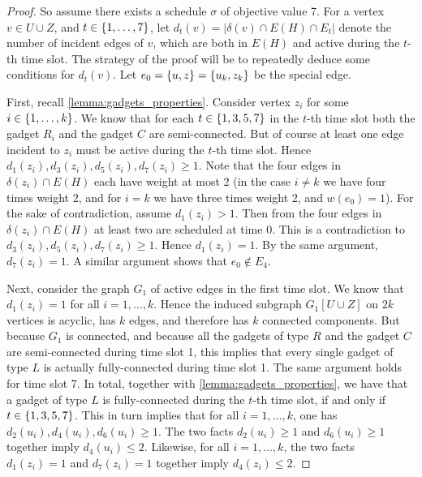 \begin{proof}
So assume there exists a schedule $\sigma$ of objective value 7. 
For a vertex $v \in U \cup Z$, and $t \in \{ 1, \ldots, 7 \}$, let $d_t(v) = |\delta(v) \cap E(H) \cap E_t|$ denote the number of incident edges of $v$, which are both in $E(H)$ and active during the $t$-th time slot. The strategy of the proof will be to repeatedly deduce some conditions for $d_t(v)$. 
Let $e_0 = \{ u, z \} = \{ u_k, z_k \}$ be the special edge.

First, recall \cref{lemma:gadgets_properties}. Consider vertex $z_i$ for some $i \in \{ 1, \ldots, k \}$. We know that for each $t \in \{ 1, 3, 5, 7 \}$ in the $t$-th time slot both the gadget $R_i$ and the gadget $C$ are semi-connected. But of course at least one edge incident to $z_i$ must be active during the $t$-th time slot. Hence $d_1(z_i), d_3(z_i), d_5(z_i), d_7(z_i) \geq 1$.  Note that the four edges in $\delta(z_i) \cap E(H)$ each have weight at most 2 (in the case $i \neq k$ we have four times weight 2, and for $i = k$ we have three times weight 2, and $w(e_0) = 1$). For the sake of contradiction, assume $d_1(z_i) > 1$. Then from the four edges in $\delta(z_i) \cap E(H)$ at least two are scheduled at time $0$. This is a contradiction to  $d_3(z_i), d_5(z_i), d_7(z_i) \geq 1$. Hence $d_1(z_i) = 1$. By the same argument, $d_7(z_i) = 1$. A similar argument shows that $e_0 \not\in E_4$.

Next, consider the graph $G_1$ of active edges in the first time slot. We know that  $d_1(z_i) = 1$ for all $i= 1,\dots, k$. Hence the induced subgraph $G_1[U \cup Z]$ on $2k$ vertices is acyclic, has $k$ edges, and therefore has $k$ connected components. But because $G_1$ is connected, and because all the gadgets of type $R$ and the gadget $C$ are semi-connected during time slot 1, this implies that every single gadget of type $L$ is actually fully-connected during time slot 1. The same argument holds for time slot 7. In total, together with \cref{lemma:gadgets_properties}, we have that a gadget of type $L$ is fully-connected during the $t$-th time slot, if and only if $t \in \{ 1, 3, 5, 7 \}$. This in turn implies that for all $i = 1,\dots, k$, one has $d_2(u_i), d_4(u_i), d_6(u_i) \geq 1$. The two facts $d_2(u_i) \geq 1$ and $d_6(u_i) \geq 1$ together imply $d_4(u_i) \leq 2$. Likewise, for all $i = 1,\dots,k$, the two facts $d_1(z_i) = 1$ and $d_7(z_i) = 1$ together imply $d_4(z_i) \leq 2$.


\end{proof}
